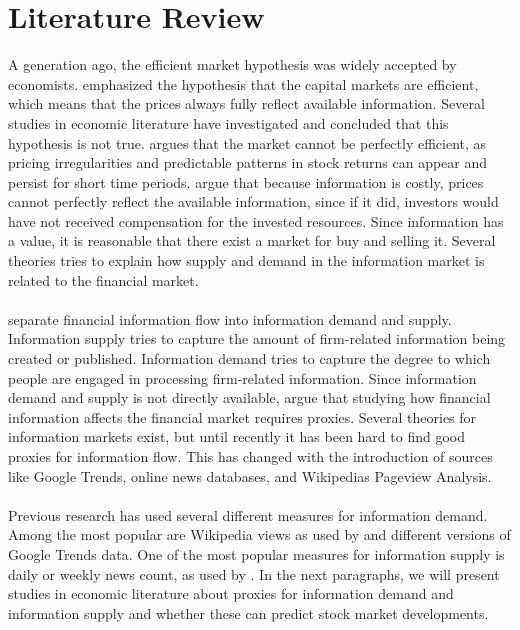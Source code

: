 
\chapter{Literature Review}
A generation ago, the efficient market hypothesis was widely accepted by economists. \cite{fama} emphasized the hypothesis that the capital markets are efficient, which means that the prices always fully reflect available information. Several studies in economic literature have investigated and concluded that this hypothesis is not true. \cite{malkiel} argues that the market cannot be perfectly efficient, as pricing irregularities and predictable patterns in stock returns can appear and persist for short time periods. \cite{grossman} argue that because information is costly, prices cannot perfectly reflect the available information, since if it did, investors would have not received compensation for the invested resources. Since information has a value, it is reasonable that there exist a market for buy and selling it. Several theories tries to explain how supply and demand in the information market is related to the financial market. 
\\\\
\cite{vlastakis} separate financial information flow into information demand and supply. Information supply tries to capture the amount of firm-related information being created or published. Information demand tries to capture the degree to which people are engaged in processing firm-related information. Since information demand and supply is not directly available, \cite{vlastakis} argue that studying how financial information affects the financial market requires proxies. Several theories for information markets exist, but until recently it has been hard to find good proxies for information flow. This has changed with the introduction of sources like Google Trends, online news databases, and Wikipedias Pageview Analysis.  
\\\\
Previous research has used several different measures for information demand. Among the most popular are Wikipedia views as used by \cite{moat} and different versions of Google Trends data. One of the most popular measures for information supply is daily or weekly news count, as used by \cite{vlastakis}. In the next paragraphs, we will present studies in economic literature about proxies for information demand and information supply and whether these can predict stock market developments. 
